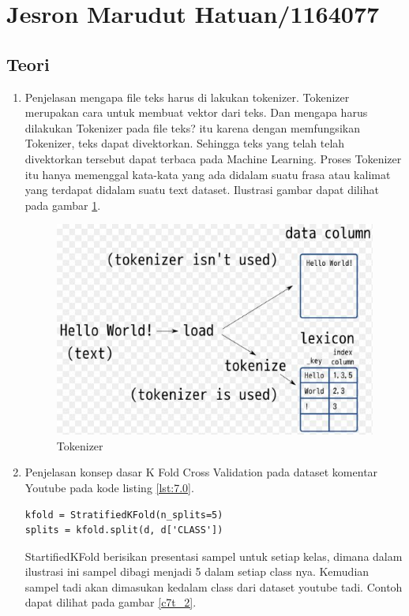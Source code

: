 
\section{Jesron Marudut Hatuan/1164077}
\subsection{Teori}
\begin{enumerate}
\item Penjelasan mengapa file teks harus di lakukan tokenizer.
\subitem Tokenizer merupakan cara untuk membuat vektor dari teks. Dan mengapa harus dilakukan Tokenizer pada file teks? itu karena dengan memfungsikan Tokenizer, teks dapat divektorkan. Sehingga teks yang telah telah divektorkan tersebut dapat terbaca pada Machine Learning. Proses Tokenizer itu hanya memenggal kata-kata yang ada didalam suatu frasa atau kalimat yang terdapat didalam suatu text dataset. Ilustrasi gambar dapat dilihat pada gambar \ref{c7t_1}.
\begin{figure}[!htbp]
\centerline{\includegraphics[width=1\textwidth]{figures/c7t/1.JPG}}
\caption{Tokenizer}
\label{c7t_1}
\end{figure}
\item Penjelasan konsep dasar K Fold Cross Validation pada dataset komentar Youtube pada kode listing \ref{lst:7.0}.
\begin{lstlisting}[caption=K Fold Cross Validation,label={lst:7.0}]
kfold = StratifiedKFold(n_splits=5)
splits = kfold.split(d, d['CLASS'])
\end{lstlisting}
\subitem StartifiedKFold berisikan presentasi sampel untuk setiap kelas, dimana dalam ilustrasi ini sampel dibagi menjadi 5 dalam setiap class nya. Kemudian sampel tadi akan dimasukan kedalam class dari dataset youtube tadi. Contoh dapat dilihat pada gambar \ref{c7t_2}.

\end{enumerate}

